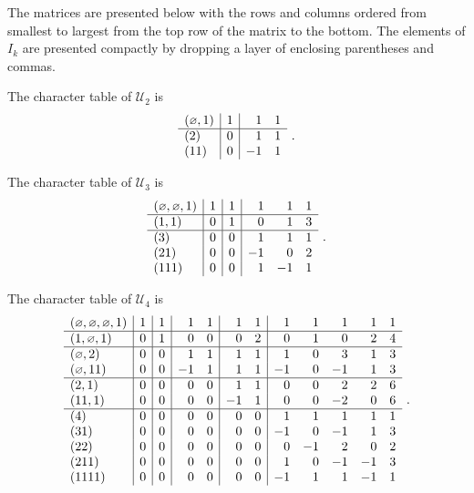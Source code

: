 \documentclass[ALCO,Unicode]{cedram}
\newcommand{\epart}{\text{\footnotesize$\varnothing$}}
\begin{document}
\begin{example} \label{Ex:charactertable}
\label{ex:UBP2chartable}
The matrices are presented below with the rows and columns ordered from
smallest to largest from the top row of the matrix to the bottom.  The elements of
$I_k$ are presented compactly by dropping a layer of enclosing parentheses and commas.

The character table of $\mathcal{U}_2$ is
$$
\begin{array}{l|r|rr}
(\epart,1) & 1 & 1 & 1\\
\hline
(2) & 0 & 1 & 1\\
(11) & 0 & -1 & 1
\end{array}~.
$$

\label{ex:UBP3chartable}
The character table
of $\mathcal{U}_3$ is
$$
\begin{array}{l|r|r|rrr}
(\epart, \epart, 1) & 1 & 1 & 1 & 1 & 1\\
\hline
(1, 1) & 0 & 1 & 0 & 1 & 3\\
\hline
(3) & 0 & 0 & 1 & 1 & 1\\
(21) & 0 & 0 & -1 & 0 & 2\\
(111) & 0 & 0 & 1 & -1 & 1
\end{array}~.
$$

\label{ex:UBP4chartable}
The character table
of $\mathcal{U}_4$ is
$$
\begin{array}{l|r|r|rr|rr|rrrrr}
(\epart, \epart, \epart, 1) & 1 & 1 & 1 & 1 & 1 & 1 & 1 & 1 & 1 & 1 & 1\\
\hline
(1, \epart, 1) &0 & 1 & 0 & 0 & 0 & 2 & 0 & 1 & 0 & 2 & 4\\
\hline
(\epart, 2) &0 & 0 & 1 & 1 & 1 & 1 & 1 & 0 & 3 & 1 & 3\\
(\epart, 11) &0 & 0 & -1 & 1 & 1 & 1 & -1 & 0 & -1 & 1 & 3\\
\hline
(2, 1) &0 & 0 & 0 & 0 & 1 & 1 & 0 & 0 & 2 & 2 & 6\\
(11, 1) &0 & 0 & 0 & 0 & -1 & 1 & 0 & 0 & -2 & 0 & 6\\
\hline
(4) &0 & 0 & 0 & 0 & 0 & 0 & 1 & 1 & 1 & 1 & 1\\
(31) &0 & 0 & 0 & 0 & 0 & 0 & -1 & 0 & -1 & 1 & 3\\
(22) &0 & 0 & 0 & 0 & 0 & 0 & 0 & -1 & 2 & 0 & 2\\
(211) &0 & 0 & 0 & 0 & 0 & 0 & 1 & 0 & -1 & -1 & 3\\
(1111) &0 & 0 & 0 & 0 & 0 & 0 & -1 & 1 & 1 & -1 & 1
\end{array}~.
$$
\end{example}
\end{document}
